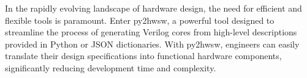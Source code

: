 In the rapidly evolving landscape of hardware design, the need for efficient and flexible tools is paramount. Enter py2hwsw, a powerful tool designed to streamline the process of generating Verilog cores from high-level descriptions provided in Python or JSON dictionaries. With py2hwsw, engineers can easily translate their design specifications into functional hardware components, significantly reducing development time and complexity.
